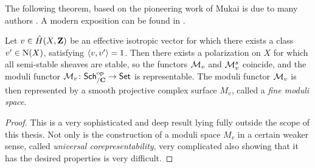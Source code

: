 
The following theorem, based on the pioneering work of Mukai \cite{Mukai1987} is due to many authors \cite{GottscheHuybrechts1996,huybrechts2006fouriermukai, OGrady1997}. A modern exposition can be found in \cite{BayerMacri2014}.

\begin{theorem}
    \label{Representability of moduli functor}
    \textsl{\cite{GottscheHuybrechts1996,huybrechts2006fouriermukai, OGrady1997,HuybrechtsLehn2010,BayerMacri2014}}
    Let $v \in \,\tilde{\!{H}}(X, \mathbf Z)$ be an effective isotropic vector for which there exists a class $v' \in \operatorname{N}(X)$, satisfying $\langle v, v' \rangle = 1$. Then there exists a polarization on $X$ for which all semi-stable sheaves are stable, so the functors $\mathcal M_v$ and $\mathcal M^s_v$ coincide, and the moduli functor $\mathcal M_v \colon \mathsf{Sch}_{/\mathbf C}^{\text{op}} \to \mathsf{Set}$ is representable. The moduli functor $\mathcal M_v$ is then represented by a smooth projective complex surface $M_v$, called a \emph{fine moduli space}.
\end{theorem}

\begin{proof}
    This is a very sophisticated and deep result lying fully outside the scope of this thesis. Not only is the construction of a moduli space $M_v$ in a certain weaker sense, called \emph{universal corepresentability}, very complicated also showing that it has the desired properties is very difficult. 
\end{proof}

